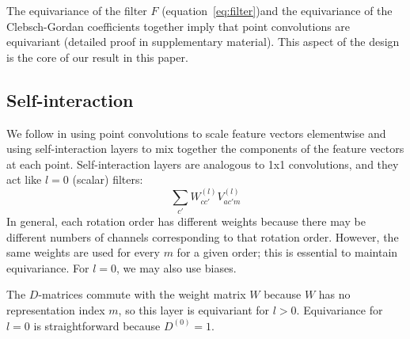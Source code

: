 \documentclass{article}
\begin{document}
The equivariance of the filter $F$ (equation~\ref{eq:filter})and the equivariance of the Clebsch-Gordan coefficients together imply that point convolutions are equivariant (detailed proof in supplementary material).  This aspect of the design %
is the core of our result in this paper.



\subsection{Self-interaction}\label{sec:self}

We follow \citet{2017arXiv170608566S} in using point convolutions to scale feature vectors elementwise and using self-interaction layers to mix together the components of the feature vectors at each point.  Self-interaction layers are analogous to 1x1 convolutions, and they act like $l=0$ (scalar) filters:
\[\sum_{c'} W^{(l)}_{cc'}V^{(l)}_{ac'm}\]
In general, each rotation order has different weights because there may be different numbers of channels corresponding to that rotation order.  However, the same weights are used for every $m$ for a given order; this is essential to maintain equivariance. For $l=0$, we may also use biases. 

The $D$-matrices commute with the weight matrix $W$ because $W$ has no representation index $m$, so this layer is equivariant for $l > 0$.  Equivariance for $l=0$ is straightforward because $D^{(0)} = 1$.
\end{document}

